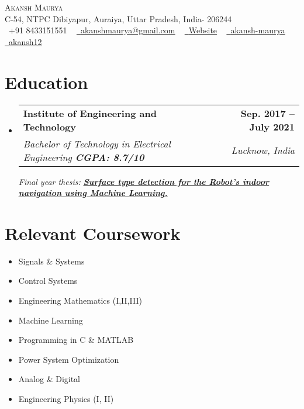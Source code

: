 \documentclass[letterpaper,11pt]{article}
\makeatletter
\newcommand{\resumeSubheading}[4]{
  \vspace{-2pt}\item
    \begin{tabular*}{1.0\textwidth}[t]{l@{\extracolsep{\fill}}r}
      \textbf{#1} & \textbf{\small #2} \\
      \textit{\small#3} & \textit{\small #4} \\
    \end{tabular*}\vspace{-7pt}
}
\newcommand{\resumeSubHeadingListStart}{\begin{itemize}[leftmargin=0.0in, label={}]}
\newcommand{\resumeSubHeadingListEnd}{\end{itemize}}
\makeatother
\begin{document}
\begin{center}
    {\Huge \scshape Akansh Maurya} \\ 
    \vspace{1pt}
    C-54, NTPC Dibiyapur, Auraiya, Uttar Pradesh, India- 206244 \\ \vspace{1pt}
    \small \raisebox{-0.1\height}\faPhone\ +91 8433151551 ~ \href{mailto:akanshmaurya@gmail.com}{\raisebox{-0.2\height}\faEnvelope\  \underline{akanshmaurya@gmail.com}} ~
    \href{https://akansh12.github.io/}{\raisebox{-0.2\height}\faGlobe\ \underline{Website}} ~
    \href{https://linkedin.com/in/akansh-maurya/}{\raisebox{-0.2\height}\faLinkedin\ \underline{akansh-maurya}}  ~
    \href{https://github.com/akansh12}{\raisebox{-0.2\height}\faGithub\ \underline{akansh12}}
    \vspace{-8pt}
\end{center}


\section{Education}
  \resumeSubHeadingListStart
    \resumeSubheading
      {Institute of Engineering and Technology}{Sep. 2017 -- July 2021}
      {Bachelor of Technology in Electrical Engineering \textbf{\textit{CGPA: 8.7/10}}}{Lucknow, India} 
      
      \textit{Final year thesis: \href{https://github.com/akansh12/help_robots_help_humanity/blob/main/Final_Thesis.pdf}{\underline{\textbf{\textit{Surface type detection for the Robot's indoor navigation using Machine Learning.}}}}}
  \resumeSubHeadingListEnd
\vspace{-20pt}
\section{Relevant Coursework}
        \begin{multicols}{5}
            \begin{itemize}[itemsep=-2pt, parsep=3pt]
                \item\small Signals \& Systems
                \item Control Systems
                \item Engineering Mathematics (I,II,III)
                \item Machine Learning
                \item Programming in C \& MATLAB
                \item Power System Optimization
                \item Analog \& Digital 
                \item Engineering Physics (I, II)
            \end{itemize}
        \end{multicols}
        \vspace*{1.0\multicolsep}
\vspace{-16pt}
\end{document}
